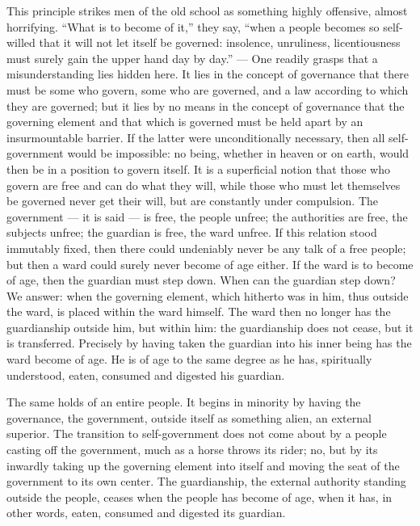 \documentclass[12pt,a4paper,openany]{book}
\newcommand{\opage}[1]{\marginnote{\footnotesize\textit{[#1]}}}
\begin{document}
This principle strikes men of the old
school as something highly offensive, almost horrifying.
``What is to become of it,'' they say, ``when a people becomes
so self-willed that it will not let itself be governed:
insolence, unruliness, licentiousness must surely gain the upper hand
day by day.'' --- One readily grasps that a misunderstanding
lies hidden here. It lies in the concept of
governance that there must be some who govern, some who
are governed, and a law according to which they are governed; but it lies
by no means in the concept of governance that the governing element and that
which is governed must be held apart by an insurmountable
barrier. If the latter were unconditionally necessary,
then all self-government would be impossible: no being, whether
in heaven or on earth, would then be in a position
\setcounter{footnote}{0}%
\opage{19}to govern itself. It is a superficial notion
that those who govern are free and can do what they
will, while those who must let themselves be governed never get
their will, but are constantly under compulsion. The government
--- it is said --- is free, the people unfree; the authorities
are free, the subjects unfree; the guardian is
free, the ward unfree. If this relation stood immutably
fixed, then there could undeniably never be any talk
of a free people; but then a ward could surely never
become of age either. If the ward is to become of age,
then the guardian must step down. When can the guardian
step down? We answer: when the governing element, which
hitherto was in him, thus outside the ward, is placed
within the ward himself. The ward then no longer has
the guardianship outside him, but within him: the guardianship
does not cease, but it is transferred. Precisely
by having taken the guardian into his inner being has the ward
become of age. He is of age to the same degree
as he has, spiritually understood, eaten, consumed and digested
his guardian.

The same holds of an entire people. It begins
in minority by having the governance, the government,
outside itself as something alien, an external superior.
The transition to self-government does not come about by
a people casting off the government, much as a horse
throws its rider; no, but by its inwardly taking up
the governing element into itself and moving the seat
of the government to its own center. The guardianship,
the external authority standing outside the people, ceases
when the people has become of age, when it has, in other
words, eaten, consumed and digested its guardian.
\end{document}
